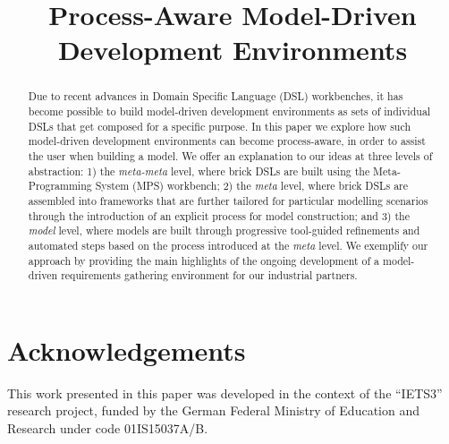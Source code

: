 \documentclass[conference]{IEEEtran}
\begin{document}
\title{Process-Aware Model-Driven Development Environments}

\author{ 
\and
{}
}

\maketitle 
 
\begin{abstract}
Due to recent advances in Domain Specific Language (DSL) workbenches, it has
become possible to build model-driven development environments as sets of
individual DSLs that get composed for a specific purpose.
In this paper we explore how such model-driven development environments can
become process-aware, in order to assist the user when building a model.
We offer an explanation to our ideas at three levels of abstraction:
1) the \emph{meta-meta} level, where brick DSLs are built using the
Meta-Programming System (MPS) workbench; 2) the \emph{meta} level, where brick
DSLs are assembled into frameworks that are further tailored for
particular modelling scenarios through the introduction of an explicit process
for model construction; and 3) the \emph{model} level, where
models are built through progressive tool-guided refinements and automated
steps based on the process introduced at the \emph{meta} level.
We exemplify our approach by providing the main highlights of the ongoing
development of a model-driven requirements gathering environment for our
industrial partners.


\end{abstract} 

 



 







 

\section*{Acknowledgements}
This work presented in this paper was developed in the context of the
``IETS3'' research project, funded by the German Federal Ministry of Education
and Research under code 01IS15037A/B.

\newpage




\clearpage 
\end{document}
